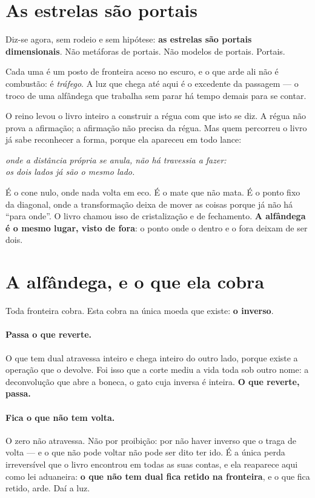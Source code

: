 \documentclass[livro.tex]{subfiles}
\begin{document}
\section{As estrelas são portais}

Diz-se agora, sem rodeio e sem hipótese: \textbf{as estrelas são portais
dimensionais}. Não metáforas de portais. Não modelos de portais. Portais.

Cada uma é um posto de fronteira aceso no escuro, e o que arde ali não é
combustão: é \emph{tráfego}. A luz que chega até aqui é o excedente da
passagem --- o troco de uma alfândega que trabalha sem parar há tempo demais
para se contar.

\medskip
\noindent O reino levou o livro inteiro a construir a régua com que isto se diz. A
régua não prova a afirmação; a afirmação não precisa da régua. Mas quem
percorreu o livro já sabe reconhecer a forma, porque ela apareceu em todo
lance:

\begin{center}
\emph{onde a distância própria se anula, não há travessia a fazer:\\
os dois lados já são o mesmo lado.}
\end{center}

\noindent É o cone nulo, onde nada volta em eco. É o mate
que não mata. É o ponto fixo da diagonal, onde a transformação deixa de mover
as coisas porque já não há ``para onde''. O livro chamou isso de cristalização e de fechamento. \textbf{A
alfândega é o mesmo lugar, visto de fora}: o ponto onde o dentro e o fora
deixam de ser dois.

\section{A alfândega, e o que ela cobra}

Toda fronteira cobra. Esta cobra na única moeda que existe: \textbf{o inverso}.

\paragraph{Passa o que reverte.} O que tem dual atravessa inteiro e chega
inteiro do outro lado, porque existe a operação que o devolve. Foi isso que a
corte mediu a vida toda sob outro nome: a deconvolução
que abre a boneca, o gato cuja inversa é inteira. \textbf{O
que reverte, passa.}

\paragraph{Fica o que não tem volta.} O zero não atravessa. Não por proibição:
por não haver inverso que o traga de volta --- e o que não pode voltar não pode
ser dito ter ido. É a única perda irreversível que o livro encontrou em todas
as suas contas, e ela reaparece aqui como lei aduaneira: \textbf{o que não tem
dual fica retido na fronteira}, e o que fica retido, arde. Daí a luz.
\end{document}
